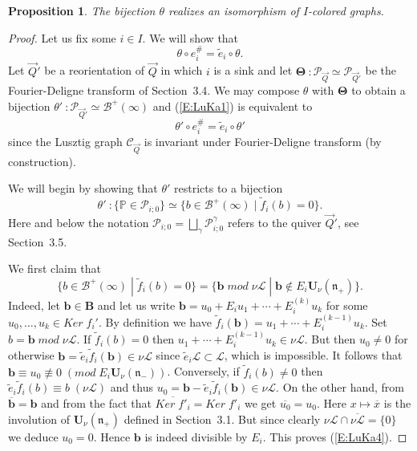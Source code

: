 \documentclass[a4paper,10pt]{amsart}
\def\U{\mathbf{U}}
\def\FD{\boldsymbol{\Theta}}
\def\n{\mathfrak{n}}
\newtheorem{prop}[theo]{Proposition}
\numberwithin{equation}{section}
\begin{document}
\begin{prop}\label{P:LusKas} The bijection $\theta$ realizes an isomorphism of $I$-colored graphs.
\end{prop}
\begin{proof} Let us fix some $i \in I$. We will show that 
\begin{equation}\label{E:LuKa1}
\theta \circ e_i^\# = \tilde{e}_i \circ \theta.
\end{equation}
Let $\vec{Q}'$ be a reorientation of $\vec{Q}$ in which $i$ is a sink and let $\FD~: \mathcal{P}_{\vec{Q}} \simeq \mathcal{P}_{\vec{Q}'}$ be the
Fourier-Deligne transform of Section~3.4.  We may compose $\theta$ with $\FD$ to obtain a bijection $\theta'~: \mathcal{P}_{\vec{Q}'} \simeq \mathcal{B}^+(\infty)$ and (\ref{E:LuKa1}) is equivalent to
\begin{equation}\label{E:LuKa2}
\theta' \circ e_i^\# = \tilde{e}_i \circ \theta'
\end{equation}
since the Lusztig graph $\mathcal{C}_{\vec{Q}}$ is invariant under Fourier-Deligne transform (by construction). 

\vspace{.1in}

We will begin by showing that $\theta'$ restricts to a bijection
\begin{equation}\label{E:LuKa3}
\theta'~: \{ \mathbb{P} \in \mathcal{P}_{i;0}\} \simeq \{ {b} \in \mathcal{B}^+(\infty)\;|\; \tilde{f}_i({b})=0\}.
\end{equation}
Here and below the notation $\mathcal{P}_{i;0}=\bigsqcup_{\gamma} \mathcal{P}^{\gamma}_{i;0}$ refers to the quiver $\vec{Q}'$, see Section~3.5. 

\vspace{.1in}

We first claim that
\begin{equation}\label{E:LuKa4}
\{b \in \mathcal{B}^+(\infty)\;|\; \tilde{f}_i(b)=0\} =\{ \mathbf{b}\;mod\;\nu \mathcal{L}\;|\; \mathbf{b} \not\in E_i \U_{\nu}(\n_+)\}.
\end{equation}
Indeed, let $\mathbf{b} \in \mathbf{B}$ and let us write $\mathbf{b}=u_0 + E_i u_1 + \cdots + E_i^{(k)}u_k$ for some $u_0, \ldots, u_k \in Ker\;f_i'$. By definition we have $\tilde{f}_i(\mathbf{b})=u_1 + \cdots + E_i^{(k-1)}u_k$. Set $b=\mathbf{b}\;mod\;\nu \mathcal{L}$. If $\tilde{f}_i(b)=0$ then $u_1+ \cdots + E_i^{(k-1)}u_k \in \nu \mathcal{L}$. But then $u_0 \neq 0$ for otherwise $\mathbf{b} = \tilde{e}_i \tilde{f}_i(\mathbf{b}) \in \nu \mathcal{L}$ since $\tilde{e}_i\mathcal{L} \subset \mathcal{L}$, which is impossible. It follows that $\mathbf{b} \equiv u_0\not\equiv 0\;(mod\;E_i\U_{\nu}(\n_-))$. Conversely, if $\tilde{f}_i(b) \neq 0$ then $\tilde{e}_i \tilde{f}_i(b) \equiv b \;(\nu \mathcal{L})$ and thus
$u_0 = \mathbf{b}-\tilde{e}_i\tilde{f}_i(\mathbf{b}) \in \nu\mathcal{L}$. On the other hand, from $\overline{\mathbf{b}}=\mathbf{b}$ and from the fact that $\overline{Ker\;f'_i}=Ker\;f'_i$ we get $\overline{u_0}=u_0$. Here $x \mapsto \overline{x}$ is the involution of $\U_{\nu}(\n_+)$ defined in Section~3.1. But since clearly $\nu \mathcal{L} \cap \overline{\nu \mathcal{L}}=\{0\}$ we deduce $u_0=0$. Hence $\mathbf{b}$ is indeed divisible by $E_i$. This proves (\ref{E:LuKa4}).


\end{proof}
\end{document}
